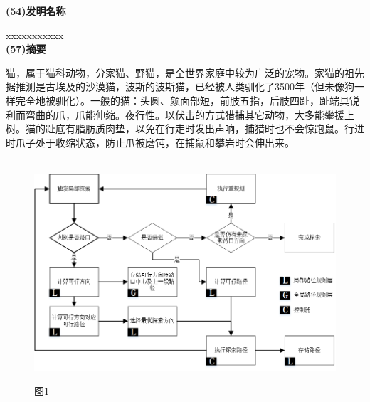 \documentclass[hyperref]{ctexart}
\begin{document}
\begin{multicols}{2}
\begin{flushleft}
	\textbf{(54)发明名称}
\end{flushleft}
{\large  xxxxxxxxxxx}\\
\textbf{(57)摘要}

{\large 猫，属于猫科动物，分家猫、野猫，是全世界家庭中较为广泛的宠物。家猫的祖先据推测是古埃及的沙漠猫，波斯的波斯猫，已经被人类驯化了3500年（但未像狗一样完全地被驯化）。一般的猫：头圆、颜面部短，前肢五指，后肢四趾，趾端具锐利而弯曲的爪，爪能伸缩。夜行性。以伏击的方式猎捕其它动物，大多能攀援上树。猫的趾底有脂肪质肉垫，以免在行走时发出声响，捕猎时也不会惊跑鼠。行进时爪子处于收缩状态，防止爪被磨钝，在捕鼠和攀岩时会伸出来。}
\newline
\newline\\
\newline\\
\newline
\begin{figure}[H]
	\begin{center}
		\includegraphics[width=0.7\linewidth]{graph/structure.png}
	\end{center}
	\begin{center}
		 \qquad \qquad 图1
	\end{center}
	\label{fig:tstmp20211203103404}
\end{figure}

	\end{multicols}
\thispagestyle{empty}
\clearpage
\end{document}

